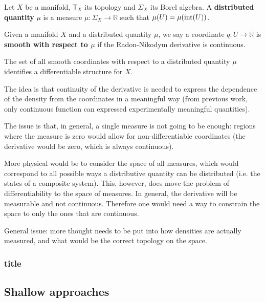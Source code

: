 \documentclass[10pt, onecolumn, longbibliography, nofootinbib]{revtex4-2}
\begin{document}
\begin{defn}
	Let $X$ be a manifold, $\textsf{T}_X$ its topology and $\Sigma_X$ its Borel algebra. A \textbf{distributed quantity} $\mu$ is a measure $\mu : \Sigma_X \to \mathbb{R}$ such that $\mu(U) = \mu(\operatorname{int}(U))$. 
\end{defn}

\begin{defn}
	Given a manifold $X$ and a distributed quantity $\mu$, we say a coordinate $q : U \to \mathbb{R}$ is \textbf{smooth with respect to $\mu$} if the Radon-Nikodym derivative is continuous.
\end{defn}

\begin{desid}
	The set of all smooth coordinates with respect to a distributed quantity $\mu$ identifies a differentiable structure for $X$.
\end{desid}

The idea is that continuity of the derivative is needed to express the dependence of the density from the coordinates in a meaningful way (from previous work, only continuous function can expressed experimentally meaningful quantities).

The issue is that, in general, a single measure is not going to be enough: regions where the measure is zero would allow for non-differentiable coordinates (the derivative would be zero, which is always continuous).

More physical would be to consider the space of all measures, which would correspond to all possible ways a distributive quantity can be distributed (i.e. the states of a composite system). This, however, does move the problem of differentiability to the space of measures. In general, the derivative will be measurable and not continuous. Therefore one would need a way to constrain the space to only the ones that are continuous.

General issue: more thought needs to be put into how densities are actually measured, and what would be the correct topology on the space.

\subsubsection{title}

\subsection{Shallow approaches}
\end{document}
